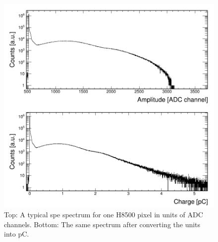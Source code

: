 \begin{figure}[hbt!]
	\centering
	\includegraphics[width=\linewidth]{figures/CA7811_w1_g064_v1100_063_adc_charge.png}
	\caption{Top: A typical spe spectrum for one H8500 pixel in units of ADC channels. Bottom: The same spectrum after converting the units into pC.}
	\label{fig:H8500calib}
\end{figure}